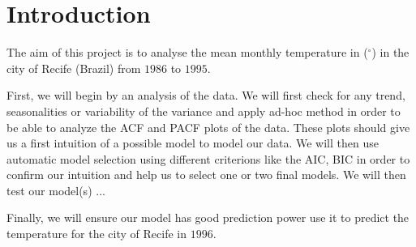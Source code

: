 \section{Introduction}

The aim of this project is to analyse the mean monthly temperature in ($^\circ$) in the city of Recife (Brazil) from $1986$ to $1995$.

First, we will begin by an analysis of the data. We will first check for any trend, seasonalities or variability of the variance and apply ad-hoc method in order to be able to analyze the ACF and PACF plots of the data. These plots should give us a first intuition of a possible model to model our data.
We will then use automatic model selection using different criterions like the AIC, BIC in order to confirm our intuition and help us to select one or two final models.
We will then test our model(s) ...

Finally, we will ensure our model has good prediction power use it to predict the temperature for the city of Recife in $1996$. 